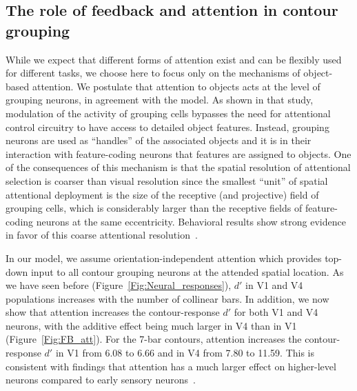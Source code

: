 {\subsection{The role of feedback and attention in contour grouping}   
While we expect that different forms of attention exist and can be
flexibly used for different tasks, we choose here to focus only on the mechanisms of object-based attention.
%
We postulate that attention to objects acts at the level of grouping
neurons, in agreement with the \cite{Mihalas_etal11b} model.  As shown
in that study, modulation of the activity of grouping cells bypasses
the need for 
attentional control circuitry
to have access to detailed object features.  Instead, grouping
neurons are used as ``handles'' of the associated objects and it is in
their interaction with feature-coding neurons that features are
assigned to objects. One of the consequences of this mechanism is that
the spatial resolution of attentional selection is coarser than visual
resolution since the smallest ``unit'' of spatial attentional
deployment is the size of the receptive (and projective) field of
grouping cells, which is considerably larger than the receptive fields
of feature-coding neurons at the same eccentricity. Behavioral results
show strong evidence in favor of this coarse attentional
resolution~\citep{Intriligator_Cavanagh01}.

In our model, we assume orientation-independent attention which
provides top-down input to all contour grouping neurons at the attended
spatial location. As we have seen before (Figure~\ref{Fig:Neural_responses}), 
$d'$ in V1 and V4 populations increases with the number of
collinear bars. 
In addition, we now show that attention increases the
contour-response $d'$ for both V1 and V4 neurons, with the additive
effect being much larger in V4 than in V1
(Figure~\ref{Fig:FB_att}). For the 7-bar contours, attention increases
the contour-response $d'$ in V1 from 6.08 to 6.66 and in V4 from 7.80
to 11.59. This is consistent with findings that attention has a much
larger effect on higher-level neurons compared to early sensory
neurons~\citep[review:][]{Treue01}.

}
